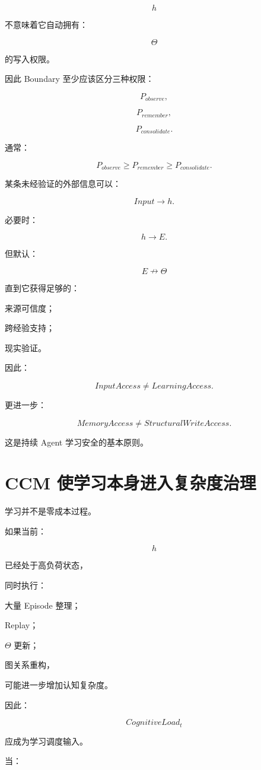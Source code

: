 \[
h
\]

不意味着它自动拥有：

\[
\Theta
\]

的写入权限。

因此 Boundary 至少应该区分三种权限：

\[
P_{observe},
\]

\[
P_{remember},
\]

\[
P_{consolidate}.
\]

通常：

\[
\boxed{
P_{observe}
\ge
P_{remember}
\ge
P_{consolidate}.
}
\]

某条未经验证的外部信息可以：

\[
Input\rightarrow h.
\]

必要时：

\[
h\rightarrow E.
\]

但默认：

\[
E\nrightarrow\Theta
\]

直到它获得足够的：

来源可信度；

跨经验支持；

现实验证。

因此：

\[
\boxed{
InputAccess
\neq
LearningAccess.
}
\]

更进一步：

\[
\boxed{
MemoryAccess
\neq
StructuralWriteAccess.
}
\]

这是持续 Agent 学习安全的基本原则。


\section{CCM 使学习本身进入复杂度治理}

学习并不是零成本过程。

如果当前：

\[
h
\]

已经处于高负荷状态，

同时执行：

大量 Episode 整理；

Replay；

\(\Theta\) 更新；

图关系重构，

可能进一步增加认知复杂度。

因此：

\[
\boxed{
CognitiveLoad_t
}
\]

应成为学习调度输入。

当：

